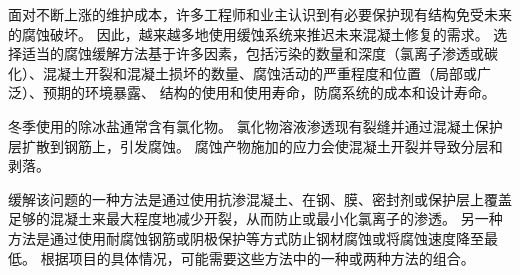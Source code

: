面对不断上涨的维护成本，许多工程师和业主认识到有必要保护现有结构免受未来的腐蚀破坏。 因此，越来越多地使用缓蚀系统来推迟未来混凝土修复的需求。 选择适当的腐蚀缓解方法基于许多因素，包括污染的数量和深度（氯离子渗透或碳化）、混凝土开裂和混凝土损坏的数量、腐蚀活动的严重程度和位置（局部或广泛）、预期的环境暴露、 结构的使用和使用寿命，防腐系统的成本和设计寿命。

冬季使用的除冰盐通常含有氯化物。 氯化物溶液渗透现有裂缝并通过混凝土保护层扩散到钢筋上，引发腐蚀。 腐蚀产物施加的应力会使混凝土开裂并导致分层和剥落。

缓解该问题的一种方法是通过使用抗渗混凝土、在钢、膜、密封剂或保护层上覆盖足够的混凝土来最大程度地减少开裂，从而防止或最小化氯离子的渗透。 另一种方法是通过使用耐腐蚀钢筋或阴极保护等方式防止钢材腐蚀或将腐蚀速度降至最低。 根据项目的具体情况，可能需要这些方法中的一种或两种方法的组合。

